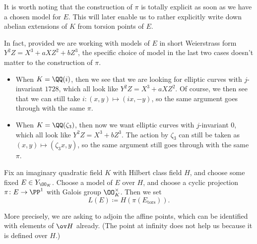 \documentclass[../notes.tex]{subfiles}
\begin{document}
\begin{remark}
	It is worth noting that the construction of $\pi$ is totally explicit as soon as we have a chosen model for $E$. This will later enable us to rather explicitly write down abelian extensions of $K$ from torsion points of $E$.
\end{remark}
\begin{remark}
	In fact, provided we are working with models of $E$ in short Weierstrass form $Y^2Z=X^3+aXZ^2+bZ^3$, the specific choice of model in the last two cases doesn't matter to the construction of $\pi$.
	\begin{itemize}
		\item When $K=\QQ(i)$, then we see that we are looking for elliptic curves with $j$-invariant $1728$, which all look like $Y^2Z=X^3+aXZ^2$. Of course, we then see that we can still take $i\colon(x,y)\mapsto(ix,-y)$, so the same argument goes through with the same $\pi$.
		\item When $K=\QQ(\zeta_3)$, then now we want elliptic curves with $j$-invariant $0$, which all look like $Y^2Z=X^3+bZ^3$. The action by $\zeta_3$ can still be taken as $(x,y)\mapsto(\zeta_3x,y)$, so the same argument still goes through with the same $\pi$.
	\end{itemize}
\end{remark}
\begin{notation}
	Fix an imaginary quadratic field $K$ with Hilbert class field $H$, and choose some fixed $E\in Y_{\OO_K}$. Choose a model of $E$ over $H$, and choose a cyclic projection $\pi\colon E\to\PP^1$ with Galois group $\OO_K^\times$. Then we set
	\[L(E)\coloneqq H(\pi(E_{\mathrm{tors}})).\]
\end{notation}
More precisely, we are asking to adjoin the affine points, which can be identified with elements of $\ov H$ already. (The point at infinity does not help us because it is defined over $H$.)
\end{document}
